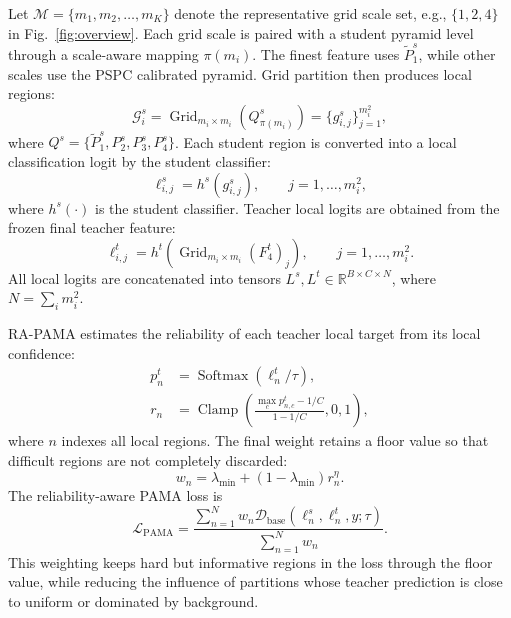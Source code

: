 \documentclass[a4paper,fleqn]{cas-dc}
\begin{document}
Let $\mathcal{M}=\{m_1,m_2,\ldots,m_K\}$ denote the representative grid scale
set, e.g., $\{1,2,4\}$ in Fig.~\ref{fig:overview}. Each grid scale is paired
with a student pyramid level through a scale-aware mapping $\pi(m_i)$. The
finest feature uses $\tilde{P}_1^s$, while other scales use the PSPC
calibrated pyramid. Grid partition then produces local regions:
\begin{equation}
    \mathcal{G}_{i}^{s}=\operatorname{Grid}_{m_i\times m_i}
    (Q_{\pi(m_i)}^{s})=
    \{g_{i,j}^{s}\}_{j=1}^{m_i^2},
\label{eq:grid_partition}
\end{equation}
where $Q^s=\{\tilde{P}_1^s,P_2^s,P_3^s,P_4^s\}$. Each student region is
converted into a local classification logit by the student classifier:
\begin{equation}
    \ell_{i,j}^{s}=h^{s}(g_{i,j}^{s}),
    \qquad j=1,\ldots,m_i^2,
\label{eq:local_logits}
\end{equation}
where $h^s(\cdot)$ is the student classifier. Teacher local logits are
obtained from the frozen final teacher feature:
\begin{equation}
    \ell_{i,j}^{t}=h^{t}\left(
    \operatorname{Grid}_{m_i\times m_i}(F_4^t)_j\right),
    \qquad j=1,\ldots,m_i^2.
\label{eq:teacher_local_logits}
\end{equation}
All local logits are concatenated into tensors
$L^s,L^t\in\mathbb{R}^{B\times C\times N}$, where $N=\sum_i m_i^2$.

RA-PAMA estimates the reliability of each teacher local target from its local
confidence:
\begin{equation}
\begin{aligned}
    p_n^t&=\operatorname{Softmax}(\ell_n^t/\tau),\\
    r_n&=\operatorname{Clamp}\left(
    \frac{\max_c p_{n,c}^t-1/C}{1-1/C},0,1\right),
\end{aligned}
\label{eq:region_reliability}
\end{equation}
where $n$ indexes all local regions. The final weight retains a floor value so
that difficult regions are not completely discarded:
\begin{equation}
    w_n=\lambda_{\min}+(1-\lambda_{\min})r_n^{\eta}.
\label{eq:region_weight}
\end{equation}
The reliability-aware PAMA loss is
\begin{equation}
    \mathcal{L}_{\operatorname{PAMA}}
    =
    \frac{\sum_{n=1}^{N}w_n
    \mathcal{D}_{\operatorname{base}}(\ell_n^s,\ell_n^t,y;\tau)}
    {\sum_{n=1}^{N}w_n}.
\label{eq:loss_pama}
\end{equation}
This weighting keeps hard but informative regions in the loss through the
floor value, while reducing the influence of partitions whose teacher
prediction is close to uniform or dominated by background.
\end{document}
